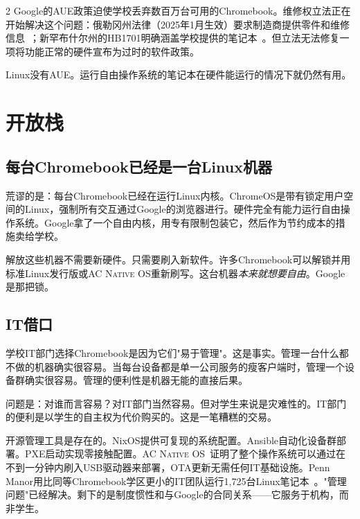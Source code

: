 \documentclass[11pt, a4paper]{article}
\newcommand{\acos}{\textsc{AC Native OS}}
\begin{document}
\begin{multicols}{2}
Google的AUE政策迫使学校丢弃数百万台可用的Chromebook。维修权立法正在开始解决这个问题：俄勒冈州法律（2025年1月生效）要求制造商提供零件和维修信息~\citep{oregon2024repair}；新罕布什尔州的HB1701明确涵盖学校提供的笔记本~\citep{newhampshire2024repair}。但立法无法修复一项将功能正常的硬件宣布为过时的软件政策。

Linux没有AUE。运行自由操作系统的笔记本在硬件能运行的情况下就仍然有用。


\section{开放栈}

\subsection{每台Chromebook已经是一台Linux机器}

荒谬的是：每台Chromebook已经在运行Linux内核。ChromeOS是带有锁定用户空间的Linux，强制所有交互通过Google的浏览器进行。硬件完全有能力运行自由操作系统。Google拿了一个自由内核，用专有限制包装它，然后作为节约成本的措施卖给学校。

解放这些机器不需要新硬件。只需要刷入新软件。许多Chromebook可以解锁并用标准Linux发行版或\acos{}重新刷写。这台机器\emph{本来就想要自由}。Google是那把锁。

\subsection{IT借口}

学校IT部门选择Chromebook是因为它们"易于管理"。这是事实。管理一台什么都不做的机器确实很容易。当每台设备都是单一公司服务的瘦客户端时，管理一个设备群确实很容易。管理的便利性是机器无能的直接后果。

问题是：对谁而言容易？对IT部门当然容易。但对学生来说是灾难性的。IT部门的便利是以学生的自主权为代价购买的。这是一笔糟糕的交易。

开源管理工具是存在的。NixOS提供可复现的系统配置。Ansible自动化设备群部署。PXE启动实现零接触配置。\acos{}~\citep{scudder2026acos}证明了整个操作系统可以通过在不到一分钟内刷入USB驱动器来部署，OTA更新无需任何IT基础设施。Penn Manor用比同等Chromebook学区更小的IT团队运行1,725台Linux笔记本~\citep{pennmanor2024linux}。"管理问题"已经解决。剩下的是制度惯性和与Google的合同关系——它服务于机构，而非学生。


\end{multicols}
\end{document}
